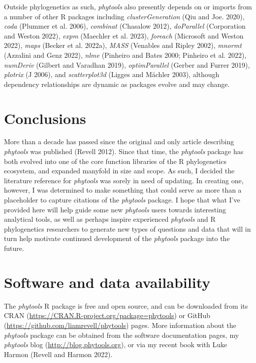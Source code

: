 \documentclass[fleqn,10pt,lineno]{wlpeerj} %
\begin{document}
Outside phylogenetics as such, \emph{phytools} also presently depends on or imports from a number of other R packages including \emph{clusterGeneration} (Qiu and Joe. 2020), \emph{coda} (Plummer et al. 2006), \emph{combinat} (Chasalow 2012), \emph{doParallel} (Corporation and Weston 2022), \emph{expm} (Maechler et al. 2023), \emph{foreach} (Microsoft and Weston 2022), \emph{maps} (Becker et al. 2022a), \emph{MASS} (Venables and Ripley 2002), \emph{mnormt} (Azzalini and Genz 2022), \emph{nlme} (Pinheiro and Bates 2000; Pinheiro et al. 2022), \emph{numDeriv} (Gilbert and Varadhan 2019), \emph{optimParallel} (Gerber and Furrer 2019), \emph{plotrix} (J 2006), and \emph{scatterplot3d} (Ligges and Mächler 2003), although dependency relationships are dynamic as packages evolve and may change.

\hypertarget{conclusions}{%
\section{Conclusions}\label{conclusions}}

More than a decade has passed since the original and only article describing \emph{phytools} was published (Revell 2012). Since that time, the \emph{phytools} package has both evolved into one of the core function libraries of the R phylogenetics ecosystem, and expanded manyfold in size and scope. As such, I decided the literature reference for \emph{phytools} was sorely in need of updating. In creating one, however, I was determined to make something that could serve as more than a placeholder to capture citations of the \emph{phytools} package. I hope that what I've provided here will help guide some new \emph{phytools} users towards interesting analytical tools, as well as perhaps inspire experienced \emph{phytools} and R phylogenetics researchers to generate new types of questions and data that will in turn help motivate continued development of the \emph{phytools} package into the future.

\hypertarget{software-and-data-availability}{%
\section{Software and data availability}\label{software-and-data-availability}}

The \emph{phytools} R package is free and open source, and can be downloaded from its CRAN (\url{https://CRAN.R-project.org/package=phytools}) or GitHub (\url{https://github.com/liamrevell/phytools}) pages. More information about the \emph{phytools} package can be obtained from the software documentation pages, my \emph{phytools} blog (\url{http://blog.phytools.org}), or via my recent book with Luke Harmon (Revell and Harmon 2022).
\end{document}

